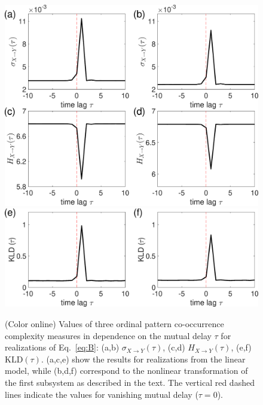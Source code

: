 \documentclass[12pt,aip,cha,reprint,nofootinbib]{revtex4-1}
\begin{document}
\begin{figure}
	\centering
	\includegraphics[width=\columnwidth]{E_B.eps}
	\includegraphics[width=\columnwidth]{KL_B.eps}
\caption{(Color online) Values of three ordinal pattern co-occurrence complexity measures in dependence on the mutual delay $\tau$ for realizations of Eq.~\eqref{eq:B}: (a,b) $\sigma_{X\to Y}(\tau)$, (c,d) $H_{X \to Y}(\tau)$, (e,f) $\text{KLD}(\tau)$. (a,c,e) show the results for realizations from the linear model, while (b,d,f) correspond to the nonlinear transformation of the first subsystem as described in the text. The vertical red dashed lines indicate the values for vanishing mutual delay ($\tau=0$).
\label{fig:stdHeqB}}
\end{figure}
\end{document}
